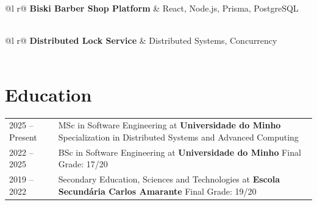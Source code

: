 \documentclass[a4paper,12pt]{article}
\begin{document}
\vspace{4pt}

\begin{tabularx}{\linewidth}{@{}l r@{}}
\textbf{Biski Barber Shop Platform} & \hfill React, Node.js, Prisma, PostgreSQL \\[3.75pt]
 \\
\end{tabularx}

\vspace{4pt}

\begin{tabularx}{\linewidth}{@{}l r@{}}
\textbf{Distributed Lock Service} & \hfill Distributed Systems, Concurrency \\[3.75pt]
 \\
\end{tabularx}


\section{Education}
\begin{tabularx}{\linewidth}{@{}l X@{}}
2025 -- Present & MSc in Software Engineering at \textbf{Universidade do Minho} \hfill \normalsize Specialization in Distributed Systems and Advanced Computing \\

2022 -- 2025 & BSc in Software Engineering at \textbf{Universidade do Minho} \hfill \normalsize Final Grade: 17/20 \\

2019 -- 2022 & Secondary Education, Sciences and Technologies at \textbf{Escola Secundária Carlos Amarante} \hfill \normalsize Final Grade: 19/20 \\
\end{tabularx}

\end{document}
